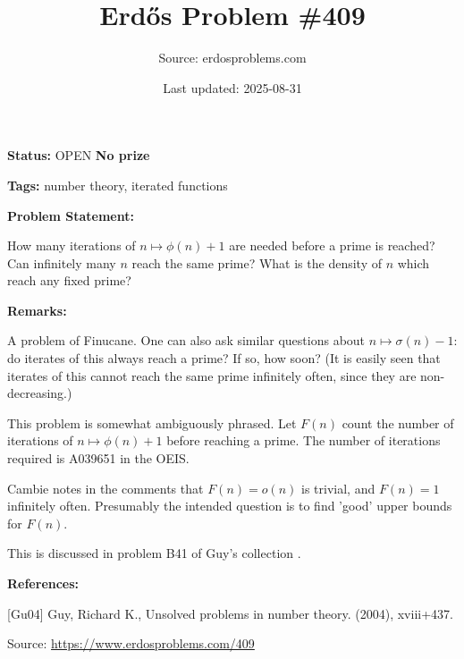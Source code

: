 \documentclass{article}
\title{Erd\H{o}s Problem \#409}
\date{Last updated: 2025-08-31}
\author{Source: erdosproblems.com}
\begin{document}
\maketitle

\noindent\textbf{Status:} OPEN \quad \textbf{No prize}

\noindent\textbf{Tags:} number theory, iterated functions

\medskip
\noindent\textbf{Problem Statement:}

How many iterations of $n\mapsto \phi(n)+1$ are needed before a prime is reached? Can infinitely many $n$ reach the same prime? What is the density of $n$ which reach any fixed prime?

\bigskip
\noindent\textbf{Remarks:}

A problem of Finucane. One can also ask similar questions about $n\mapsto \sigma(n)-1$: do iterates of this always reach a prime? If so, how soon? (It is easily seen that iterates of this cannot reach the same prime infinitely often, since they are non-decreasing.)

This problem is somewhat ambiguously phrased. Let $F(n)$ count the number of iterations of $n\mapsto \phi(n)+1$ before reaching a prime. The number of iterations required is A039651 in the OEIS.

Cambie notes in the comments that $F(n)=o(n)$ is trivial, and $F(n)=1$ infinitely often. Presumably the intended question is to find 'good' upper bounds for $F(n)$.

This is discussed in problem B41 of Guy's collection \cite{Gu04}.

\bigskip
\noindent\textbf{References:}

[Gu04] Guy, Richard K., Unsolved problems in number theory. (2004), xviii+437.

\bigskip
\noindent\small{Source: \url{https://www.erdosproblems.com/409}}
\end{document}
